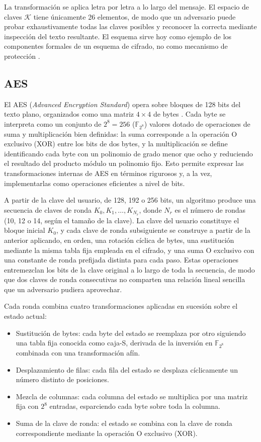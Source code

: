 La transformación se aplica letra por letra a lo largo del mensaje. El espacio de claves $\mathcal{K}$ tiene únicamente 26 elementos, de modo que un adversario puede probar exhaustivamente todas las claves posibles y reconocer la correcta mediante inspección del texto resultante. El esquema sirve hoy como ejemplo de los componentes formales de un esquema de cifrado, no como mecanismo de protección \cite{KatzLindell}.

\subsection{AES}

El AES (\textit{Advanced Encryption Standard}) opera sobre bloques de 128 bits del texto plano, organizados como una matriz $4 \times 4$ de bytes \cite{KatzLindell}. Cada byte se interpreta como un conjunto de $2^8 = 256$ ($\mathbb{F}_{2^8}$) valores dotado de operaciones de suma y multiplicación bien definidas: la suma corresponde a la operación O exclusivo (XOR) entre los bits de dos bytes, y la multiplicación se define identificando cada byte con un polinomio de grado menor que ocho y reduciendo el resultado del producto módulo un polinomio fijo. Esto permite expresar las transformaciones internas de AES en términos rigurosos y, a la vez, implementarlas como operaciones eficientes a nivel de bits.

A partir de la clave del usuario, de 128, 192 o 256 bits, un algoritmo produce una secuencia de claves de ronda $K_0, K_1, \dots, K_{N_r}$, donde $N_r$ es el número de rondas (10, 12 o 14, según el tamaño de la clave). La clave del usuario constituye el bloque inicial $K_0$, y cada clave de ronda subsiguiente se construye a partir de la anterior aplicando, en orden, una rotación cíclica de bytes, una sustitución mediante la misma tabla fija empleada en el cifrado, y una suma O exclusivo con una constante de ronda prefijada distinta para cada paso. Estas operaciones entremezclan los bits de la clave original a lo largo de toda la secuencia, de modo que dos claves de ronda consecutivas no comparten una relación lineal sencilla que un adversario pudiera aprovechar.

Cada ronda combina cuatro transformaciones aplicadas en sucesión sobre el estado actual:

\begin{itemize}
    \item Sustitución de bytes: cada byte del estado se reemplaza por otro siguiendo una tabla fija conocida como caja-S, derivada de la inversión en $\mathbb{F}_{2^8}$ combinada con una transformación afín.
    \item Desplazamiento de filas: cada fila del estado se desplaza cíclicamente un número distinto de posiciones.
    \item Mezcla de columnas: cada columna del estado se multiplica por una matriz fija con $2^8$ entradas, esparciendo cada byte sobre toda la columna.
    \item Suma de la clave de ronda: el estado se combina con la clave de ronda correspondiente mediante la operación O exclusivo (XOR).
\end{itemize}

